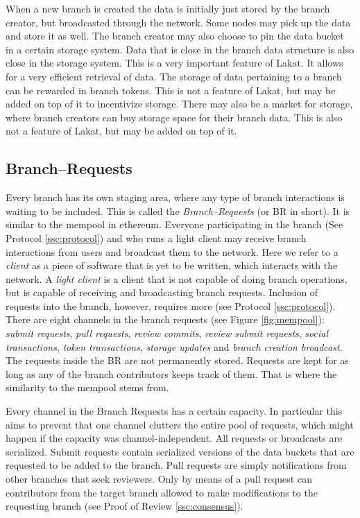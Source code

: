 \documentclass[14pt]{article}
\begin{document}
When a new branch is created the data is initially just stored by the branch creator, but broadcasted through the network. Some nodes may pick up the data and store it as well. The branch creator may also choose to pin the data bucket in a certain storage system. Data that is close in the branch data structure is also close in the storage system. This is a very important feature of Lakat. It allows for a very efficient retrieval of data. The storage of data pertaining to a branch can be rewarded in branch tokens. This is not a feature of Lakat, but may be added on top of it to incentivize storage. There may also be a market for storage, where branch creators can buy storage space for their branch data. This is also not a feature of Lakat, but may be added on top of it.

\subsection{Branch--Requests}
\label{ssc:branchrequests}

Every branch has its own staging area, where any type of branch interactions is waiting to be included. This is called the \textit{Branch--Requests} (or BR in short). It is similar to the mempool in ethereum. Everyone participating in the branch (See Protocol \ref{ssc:protocol}) and who runs a light client may receive branch interactions from users and broadcast them to the network. Here we refer to a \textit{client} as a piece of software that is yet to be written, which interacts with the network. A \textit{light client} is a client that is not capable of doing branch operations, but is capable of receiving and broadcasting branch requests. Inclusion of requests into the branch, however, requires more (see Protocol \ref{ssc:protocol}). There are eight channels in the branch requests (see Figure \ref{fig:mempool}): \textit{submit requests}, \textit{pull requests}, \textit{review commits}, \textit{review submit requests}, \textit{social transactions}, \textit{token transactions}, \textit{storage updates} and \textit{branch creation broadcast}. The requests inside the BR are not permanently stored. Requests are kept for as long as any of the branch contributors keeps track of them. That is where the similarity to the mempool stems from.

Every channel in the Branch Requests has a certain capacity. In particular this aims to prevent that one channel clutters the entire pool of requests, which might happen if the capacity was channel-independent. All requests or broadcasts are serialized. 
Submit requests contain serialized versions of the data buckets that are requested to be added to the branch. Pull requests are simply notifications from other branches that seek reviewers. Only by means of a pull request can contributors from the target branch allowed to make modifications to the requesting branch (see Proof of Review \ref{ssc:consensus}).
\end{document}
